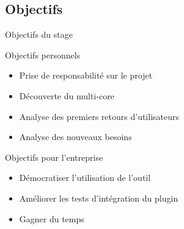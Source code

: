 \subsection{Objectifs}
\begin{frame}{Objectifs du stage} 
	\begin{block}{Objectifs personnels}
	\begin{itemize}
		\item Prise de responsabilité sur le projet
		\item Découverte du multi-core
		\item Analyse des premiers retours d'utilisateurs
		\item Analyse des nouveaux besoins
	\end{itemize}
\end{block}
\pause
\begin{block}{Objectifs pour l'entreprise}
	\begin{itemize}
		\item Démocratiser l'utilisation de l'outil
		\item Améliorer les tests d'intégration du plugin
		\item Gagner du temps 
	\end{itemize}
\end{block}
\end{frame}


